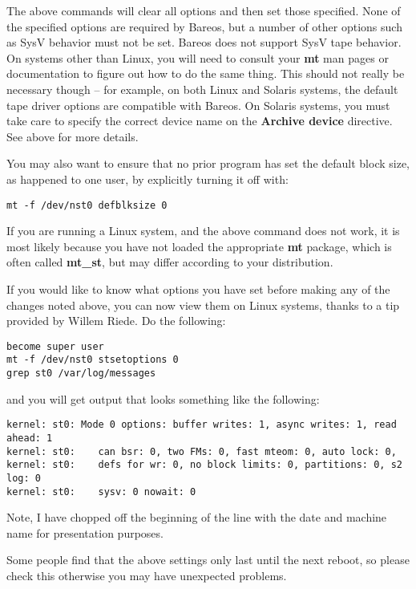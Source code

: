 {The above commands will clear all options and then set those specified. None
of the specified options are required by Bareos, but a number of other options
such as SysV behavior must not be set. Bareos does not support SysV tape
behavior. On systems other than Linux, you will need to consult your {\bf mt}
man pages or documentation to figure out how to do the same thing. This should
not really be necessary though -- for example, on both Linux and Solaris
systems, the default tape driver options are compatible with Bareos.
On Solaris systems, you must take care to specify the correct device
name on the {\bf Archive device} directive. See above for more details.

You may also want to ensure that no prior program has set the default block
size, as happened to one user, by explicitly turning it off with:

\footnotesize
\begin{verbatim}
mt -f /dev/nst0 defblksize 0
\end{verbatim}
\normalsize

If you are running a Linux
system, and the above command does not work, it is most likely because you
have not loaded the appropriate {\bf mt} package, which is often called
{\bf mt\_st}, but may differ according to your distribution.

If you would like to know what options you have set before making any of the
changes noted above, you can now view them on Linux systems, thanks to a tip
provided by Willem Riede. Do the following:

\footnotesize
\begin{verbatim}
become super user
mt -f /dev/nst0 stsetoptions 0
grep st0 /var/log/messages
\end{verbatim}
\normalsize

and you will get output that looks something like the following:

\footnotesize
\begin{verbatim}
kernel: st0: Mode 0 options: buffer writes: 1, async writes: 1, read ahead: 1
kernel: st0:    can bsr: 0, two FMs: 0, fast mteom: 0, auto lock: 0,
kernel: st0:    defs for wr: 0, no block limits: 0, partitions: 0, s2 log: 0
kernel: st0:    sysv: 0 nowait: 0
\end{verbatim}
\normalsize

Note, I have chopped off the beginning of the line with the date and machine
name for presentation purposes.

Some people find that the above settings only last until the next reboot, so
please check this otherwise you may have unexpected problems.

}
